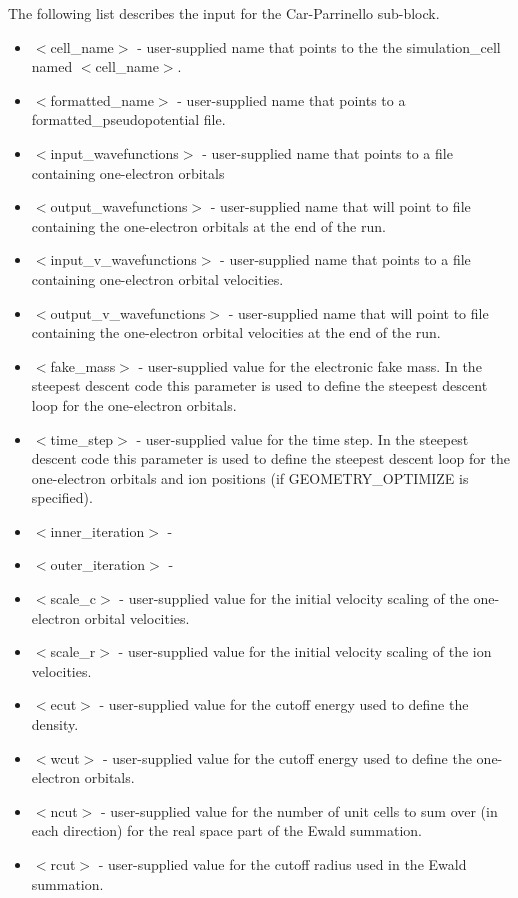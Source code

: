 The following list describes the input for the Car-Parrinello
sub-block.
\begin{itemize}
	\item $<$cell\_name$>$ - user-supplied name that points to the
              the simulation\_cell named $<$cell\_name$>$.
	\item $<$formatted\_name$>$ - user-supplied name that points
              to a formatted\_pseudopotential file.
	\item $<$input\_wavefunctions$>$ - user-supplied name that points
              to a file containing one-electron orbitals
	\item $<$output\_wavefunctions$>$ - user-supplied name that will
              point to file containing the one-electron orbitals at the
              end of the run. 
	\item $<$input\_v\_wavefunctions$>$ - user-supplied name that points
              to a file containing one-electron orbital velocities.
	\item $<$output\_v\_wavefunctions$>$ - user-supplied name that will
              point to file containing the one-electron orbital velocities
	      at the end of the run. 
	\item $<$fake\_mass$>$ - user-supplied value for the electronic
              fake mass.  In the steepest descent code this parameter is
              used to define the steepest descent loop for the one-electron
              orbitals.
	\item $<$time\_step$>$ - user-supplied value for the time step.
               In the steepest descent code this parameter is used to
               define the steepest descent loop for the one-electron orbitals
               and ion positions (if GEOMETRY\_OPTIMIZE is specified).
	\item $<$inner\_iteration$>$ -
	\item $<$outer\_iteration$>$ -
 	\item $<$scale\_c$>$ - user-supplied value for the initial velocity
			      scaling of the one-electron orbital velocities.
	\item $<$scale\_r$>$ - user-supplied value for the initial velocity
			      scaling of the ion velocities.
	\item $<$ecut$>$ - user-supplied value for the cutoff energy used
                           to define the density.
	\item $<$wcut$>$ - user-supplied value for the cutoff energy used
 			   to define the one-electron orbitals.
	\item $<$ncut$>$ - user-supplied value for the number of unit cells
 			  to sum over (in each direction) for the real space
			  part of the Ewald summation.
	\item $<$rcut$>$ - user-supplied value for the cutoff radius used
			  in the Ewald summation.
\end{itemize}



